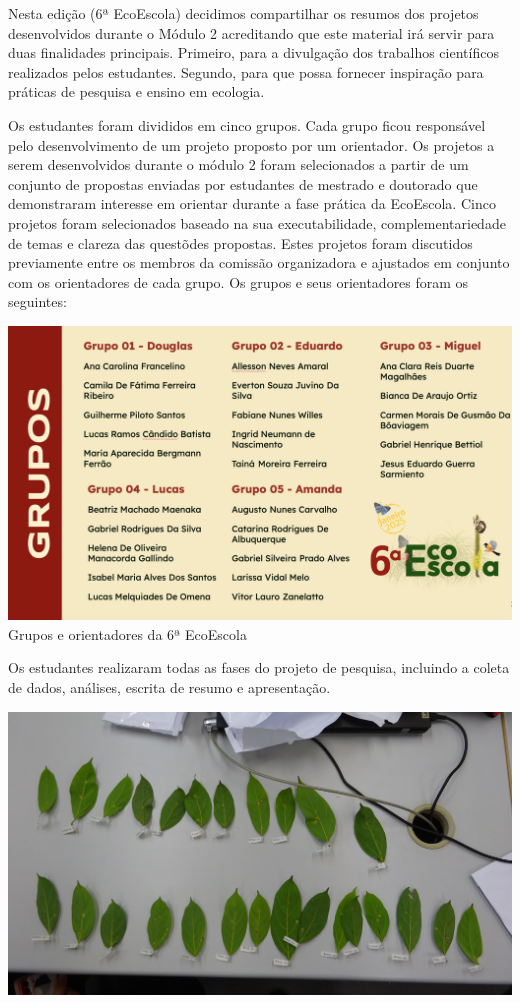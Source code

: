 \documentclass[
]{book}
\begin{document}
Nesta edição (6ª EcoEscola) decidimos compartilhar os resumos dos projetos desenvolvidos durante o Módulo 2 acreditando que este material irá servir para duas finalidades principais. Primeiro, para a divulgação dos trabalhos científicos realizados pelos estudantes. Segundo, para que possa fornecer inspiração para práticas de pesquisa e ensino em ecologia.

Os estudantes foram divididos em cinco grupos. Cada grupo ficou responsável pelo desenvolvimento de um projeto proposto por um orientador. Os projetos a serem desenvolvidos durante o módulo 2 foram selecionados a partir de um conjunto de propostas enviadas por estudantes de mestrado e doutorado que demonstraram interesse em orientar durante a fase prática da EcoEscola. Cinco projetos foram selecionados baseado na sua executabilidade, complementariedade de temas e clareza das questõdes propostas. Estes projetos foram discutidos previamente entre os membros da comissão organizadora e ajustados em conjunto com os orientadores de cada grupo. Os grupos e seus orientadores foram os seguintes:

\includegraphics{figs/grupos_modulo2.png}
Grupos e orientadores da 6ª EcoEscola

Os estudantes realizaram todas as fases do projeto de pesquisa, incluindo a coleta de dados, análises, escrita de resumo e apresentação.

\begin{center}\includegraphics[width=0.7\linewidth]{figs/coleta1} \end{center}
\end{document}
